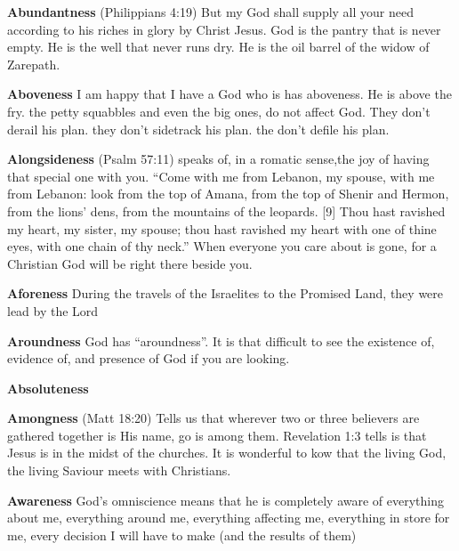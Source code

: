 \begin{compactenum}[I.][19]
    \item \textbf{Abundantness}  (Philippians 4:19) But my God shall supply all your need according to his riches in glory by Christ Jesus. God is the pantry that is never empty. He is the well that never runs dry. He is the oil barrel of the widow of Zarepath.
    \item \textbf{Aboveness} I am happy that I have a God who is has aboveness.  He is above the fry. the petty squabbles and even the big ones, do not affect God.  They don't derail his plan. they don't sidetrack his plan. the don't defile his plan.
    \item \textbf{Alongsideness}  (Psalm 57:11) speaks of, in a romatic sense,the joy of having that special one with you.  ``Come with me from Lebanon, my spouse, with me from Lebanon: look from the top of Amana, from the top of Shenir and Hermon, from the lions’ dens, from the mountains of the leopards. [9] Thou hast ravished my heart, my sister, my spouse; thou hast ravished my heart with one of thine eyes, with one chain of thy neck.'' When everyone you care about is gone, for a Christian God will be right there beside you.
    \item \textbf{Aforeness} During the travels of the Israelites to the Promised Land, they were lead by the Lord%
    \item \textbf{Aroundness} God has ``aroundness''. It is that difficult to see the existence of, evidence of, and presence of God if you are looking.%
    \item \textbf{Absoluteness} %
    \item \textbf{Amongness} (Matt 18:20) Tells us that wherever two or three believers are gathered together is His name, go is among them.    Revelation 1:3 tells is that Jesus is in the midst of the churches.  It is wonderful to kow that the living God, the living Saviour meets with Christians.
    \item \textbf{Awareness} God's omniscience means that he is completely aware of everything about me, everything around me, everything affecting me, everything in store for me, every decision I will have to make (and the results of them)%

\end{compactenum}
